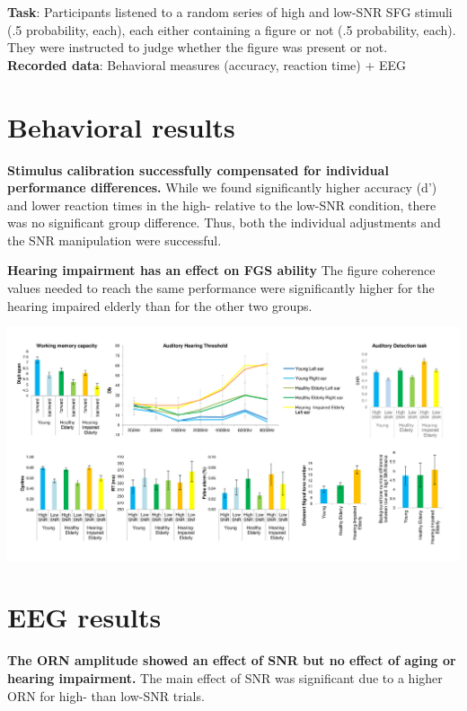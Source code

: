 \documentclass[a0,portrait]{a0poster}
\begin{document}
\begin{multicols}{2}
\textbf{Task}: Participants listened to a random series of high and low-SNR SFG stimuli (.5 probability, each), each either containing a figure or not (.5 probability, each). They were instructed to judge whether the figure was present or not. \\
\textbf{Recorded data}: Behavioral measures (accuracy, reaction time) + EEG
\section*{Behavioral results}

	 \textbf{Stimulus calibration successfully compensated for individual performance differences.} While we found significantly higher accuracy (d') and lower reaction times in the high- relative to the low-SNR condition, there was no significant group difference. Thus, both the individual adjustments and the SNR manipulation were successful.
	
	 \textbf{Hearing impairment has an effect on FGS ability} The figure coherence values needed to reach the same performance were significantly higher for the hearing impaired elderly than for the other two groups.
	 
	 \begin{center}\vspace{0cm}
	 	\includegraphics[width=0.95\linewidth]{Fig_behav.png}
	 \end{center}\vspace{0cm}
 
 
 \section*{EEG results}
	
	 \textbf{The ORN amplitude showed an effect of SNR but no effect of aging or hearing impairment.} The main effect of SNR was significant due to a higher ORN for high- than low-SNR trials.
	

\end{multicols}
\end{document}
